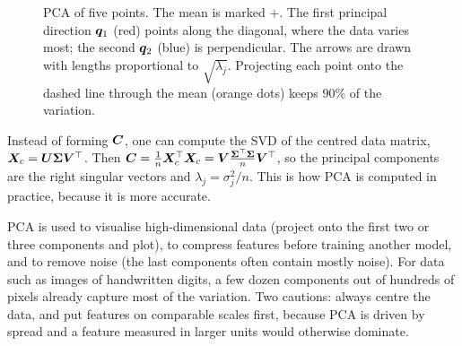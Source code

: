 \begin{figure}[htbp]
\centering
{}
\caption{PCA of five points. The mean is marked $+$. The first principal
  direction $\bm{q}_1$ (red) points along the diagonal, where the data varies
  most; the second $\bm{q}_2$ (blue) is perpendicular. The arrows are drawn with
  lengths proportional to $\sqrt{\lambda_j}$. Projecting each point onto the
  dashed line through the mean (orange dots) keeps $90\%$ of the variation.}
\label{fig:pca}
\end{figure}

\begin{remark}
Instead of forming $\bm{C}$, one can compute the SVD of the centred data matrix,
$\bm{X}_c = \bm{U}\bm{\Sigma}\bm{V}^\top$. Then $\bm{C} = \frac1n\bm{X}_c^\top\bm{X}_c =
\bm{V}\frac{\bm{\Sigma}^\top\bm{\Sigma}}{n}\bm{V}^\top$, so the principal components are the
right singular vectors and $\lambda_j = \sigma_j^2/n$. This is how PCA is
computed in practice, because it is more accurate.
\end{remark}

\begin{mlnote}
PCA is used to visualise high-dimensional data (project onto the first two or
three components and plot), to compress features before training another
model, and to remove noise (the last components often contain mostly noise).
For data such as images of handwritten digits, a few dozen components out of
hundreds of pixels already capture most of the variation. Two cautions: always
centre the data, and put features on comparable scales first, because PCA is
driven by spread and a feature measured in larger units would otherwise
dominate.
\end{mlnote}

